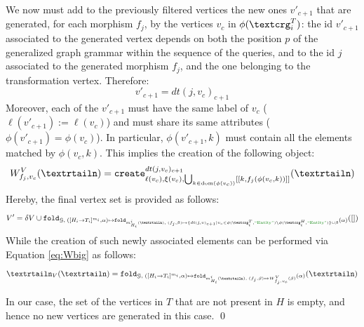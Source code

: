 We now must add to the previously filtered vertices the new ones $v'_{c+1}$ that are generated, for each morphism $f_j$, by the vertices $v_c$ in $\phi(\ngraph_i^T)$: the id $v'_{c+1}$ associated to the generated vertex depends on both the position $p$ of the generalized graph grammar within the sequence of the queries, and to the id $j$ associated to the generated morphism $f_j$, and the one belonging to the transformation vertex. Therefore:
\[v'_{c+1}=dt(j,v_c)_{c+1}\]
Moreover, each of the $v'_{c+1}$ must have the same label of $v_c$ ($\ell(v'_{c+1}):=\ell(v_c)$) and must share its same attributes ($\phi(v'_{c+1})=\phi(v_c)$). In particular, $\phi(v'_{c+1},k)$ must contain all the elements matched by $\phi(v_c,k)$. This implies the creation of the following object: %
\begin{equation}\label{eq:Wbig}
W_{f_j,v_c}^V(\nested)=\texttt{create}^{dt(j,v_c)_{c+1}}_{\ell(v_c),\xi(v_c),\bigcup_{k\in\dom(\phi(v_c))} [[k,f_j(\phi(v_c,k))]]}(\nested)
\end{equation}
Hereby, the final vertex set is provided as follows:
\[V'=\delta V\cup \texttt{fold}_{\mathcal{G},\;([H_i\to T_i]^{m_i},\alpha)\mapsto \texttt{fold}_{m^i_{H_i}(\nested),\;(f_j,\beta)\mapsto \{dt(j,v)_{c+1}|v_c\in \phi(\ngraph_i^T,\ONTA)\backslash\phi(\ngraph_i^H,\ONTA)\}\cup\beta }(\alpha)}([])\]
While the creation of such newly associated elements can be performed via Equation \ref{eq:Wbig} as follows:
\[\nested_V(\nested)=\texttt{fold}_{\mathcal{G},\;([H_i\to T_i]^{m_i},\alpha)\mapsto \texttt{fold}_{m^i_{H_i}(\nested),\;(f_j,\beta)\mapsto W^V_{f_j,v_c}(\beta) }(\alpha)}(\nested)\]

\begin{example}[continues=ex:firstforgrammars1,label=ex:firstforgrammars2]
	In our case, the set of the vertices in $T$ that are not present in $H$ is empty, and hence no new vertices are generated in this case. \qed
\end{example}
\bigskip

